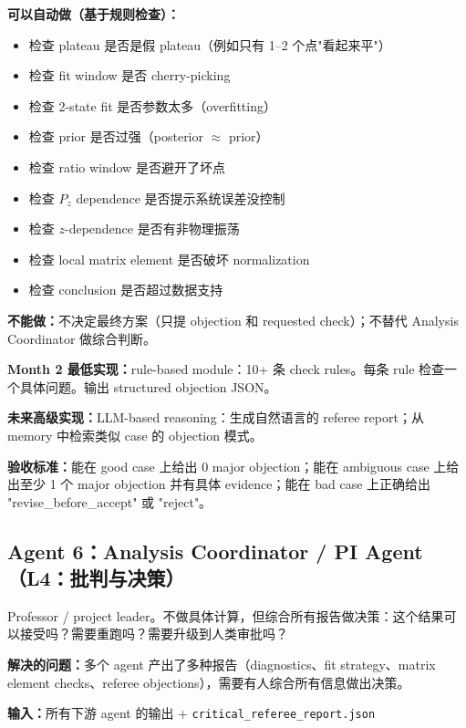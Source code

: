 \documentclass[11pt,a4paper,fontset=fandol]{ctexart}
\begin{document}
\textbf{可以自动做（基于规则检查）：}
\begin{itemize}
  \item 检查 plateau 是否是假 plateau（例如只有 1--2 个点"看起来平"）
  \item 检查 fit window 是否 cherry-picking
  \item 检查 2-state fit 是否参数太多（overfitting）
  \item 检查 prior 是否过强（posterior $\approx$ prior）
  \item 检查 ratio window 是否避开了坏点
  \item 检查 $P_z$ dependence 是否提示系统误差没控制
  \item 检查 $z$-dependence 是否有非物理振荡
  \item 检查 local matrix element 是否破坏 normalization
  \item 检查 conclusion 是否超过数据支持
\end{itemize}

\textbf{不能做：}不决定最终方案（只提 objection 和 requested check）；不替代 Analysis Coordinator 做综合判断。

\textbf{Month 2 最低实现：}rule-based module：10+ 条 check rules。每条 rule 检查一个具体问题。输出 structured objection JSON。

\textbf{未来高级实现：}LLM-based reasoning：生成自然语言的 referee report；从 memory 中检索类似 case 的 objection 模式。

\textbf{验收标准：}能在 good case 上给出 0 major objection；能在 ambiguous case 上给出至少 1 个 major objection 并有具体 evidence；能在 bad case 上正确给出 "revise\_before\_accept" 或 "reject"。

\subsection{Agent 6：Analysis Coordinator / PI Agent（L4：批判与决策）}

\begin{tcolorbox}[colback=gray!5,colframe=gray!50,title=真实科研组类比]
Professor / project leader。不做具体计算，但综合所有报告做决策：这个结果可以接受吗？需要重跑吗？需要升级到人类审批吗？
\end{tcolorbox}

\textbf{解决的问题：}多个 agent 产出了多种报告（diagnostics、fit strategy、matrix element checks、referee objections），需要有人综合所有信息做出决策。

\textbf{输入：}所有下游 agent 的输出 + \texttt{critical\_referee\_report.json}
\end{document}
